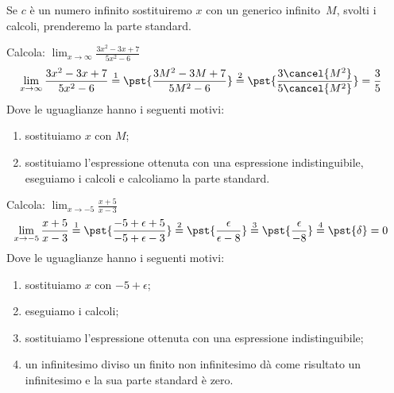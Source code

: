 Se \(c\) è un numero infinito sostituiremo \(x\) con un generico 
infinito~\(M\), svolti i calcoli, prenderemo la parte standard.

\begin{esempio}
Calcola: \quad 
  \(\displaystyle \lim_{x \rightarrow \infty} \frac{3x^2-3x+7}{5x^2-6}\)
\begin{align*}
\lim_{x \rightarrow \infty} \frac{3x^2-3x+7}{5x^2-6} & \stackrel{1}{=} 
  \pst{\frac{3M^2-3M+7}{5M^2-6}} \stackrel{2}{=}  
  \pst{\frac{3\cancel{M^2}}{5\cancel{M^2}}} = \frac{3}{5}
\end{align*}
Dove le uguaglianze hanno i seguenti motivi:
\begin{enumerate} [nosep]
 \item sostituiamo \(x\) con \(M\);
 \item sostituiamo l'espressione ottenuta con una espressione 
   indistinguibile, eseguiamo i calcoli e calcoliamo la parte standard.
\end{enumerate}
\end{esempio}

\begin{esempio}
Calcola: \quad 
  \(\displaystyle \lim_{x \rightarrow -5} \frac{x+5}{x-3}\)
\begin{align*}
\lim_{x \rightarrow -5} \frac{x+5}{x-3} & \stackrel{1}{=} 
  \pst{\frac{-5+\epsilon+5}{-5+\epsilon-3}} \stackrel{2}{=}  
  \pst{\frac{\epsilon}{\epsilon-8}} \stackrel{3}{=} 
  \pst{\frac{\epsilon}{-8}} \stackrel{4}{=} \pst{\delta} = 0
\end{align*}
Dove le uguaglianze hanno i seguenti motivi:
\begin{enumerate} [nosep]
 \item sostituiamo \(x\) con \(-5+\epsilon\);
 \item eseguiamo i calcoli;
 \item sostituiamo l'espressione ottenuta con una espressione 
   indistinguibile;
 \item un infinitesimo diviso un finito non infinitesimo dà come risultato 
un infinitesimo e la sua parte standard è zero.
\end{enumerate}
\end{esempio}

